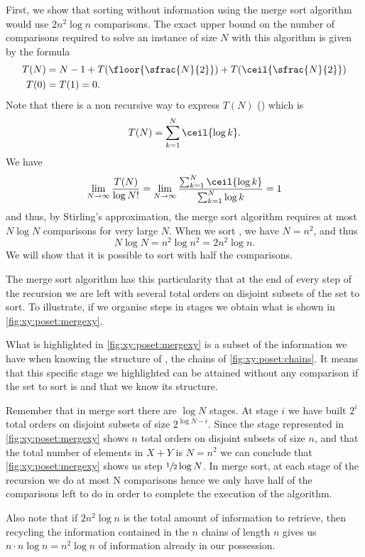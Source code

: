 First, we show that sorting \XY without information using the merge sort algorithm would use $2
n^2 \log n$ comparisons. The exact upper bound on the number
of comparisons required to solve an instance of size \(N\) with this algorithm
is given by the formula
\begin{align*}
T(N) &= N - 1 + T(\floor{\sfrac{N}{2}}) + T(\ceil{\sfrac{N}{2}})\\
T(0) &= T(1) = 0.
\end{align*}
Note that there is a non recursive way to express \(T(N)\) (\citet*{OEIS:A001855}) which is
\begin{displaymath}
T(N) = \sum_{k=1}^{N} \ceil{\log k}.
\end{displaymath}
We have
\begin{displaymath}
\lim_{N\to\infty}\frac{T(N)}{\log N!} =
\lim_{N\to\infty}\frac{\sum_{k=1}^{N}\ceil{\log k}}{ \sum_{k=1}^{N} \log k} = 1
\end{displaymath}
and thus, by Stirling's approximation, the merge sort algorithm requires at
most \(N \log N\) comparisons for very large \(N\). When we sort \XY, we have \(N =
n^2\), and thus
\[N \log N = n^2 \log n^2 = 2 n^2 \log n.\]
We will show that it is possible to sort \XY with half the comparisons.

The merge sort algorithm has this particularity that at the end of every step
of the recursion we are left with several total orders on disjoint subsets of
the set to sort. To illustrate, if we organise steps in stages we obtain what
is shown in \ref{fig:xy:poset:mergexy}.

What is highlighted in \ref{fig:xy:poset:mergexy} is a subset of the
information we have when knowing the structure of \XY, \ie the chains of
\ref{fig:xy:poset:chains}. It means that this specific stage we
highlighted can be attained without any comparison if the set to sort is \XY
and that we know its structure.

Remember that in merge sort there are $\log N$ stages. At stage $i$ we have
built $2^{i}$ total orders on disjoint subsets of size $2^{\log N - i}$. Since
the stage represented in \ref{fig:xy:poset:mergexy} shows $n$ total orders on
disjoint subsets of size $n$, and that the total number of elements in $X+Y$ is
$N = n^2$ we can conclude that \ref{fig:xy:poset:mergexy} shows us step
$\sfrac{1}{2} \log N$. In merge sort, at each stage of the recursion we do at
most N comparisons hence we only have half of the comparisons left to do in
order to complete the execution of the algorithm.

Also note that if \(2n^2 \log n\) is the total amount of information to
retrieve, then recycling the information contained in the \(n\) chains of
length \(n\) gives us \(n \cdot n \log n = n^2 \log n\) of information already in
our possession.
